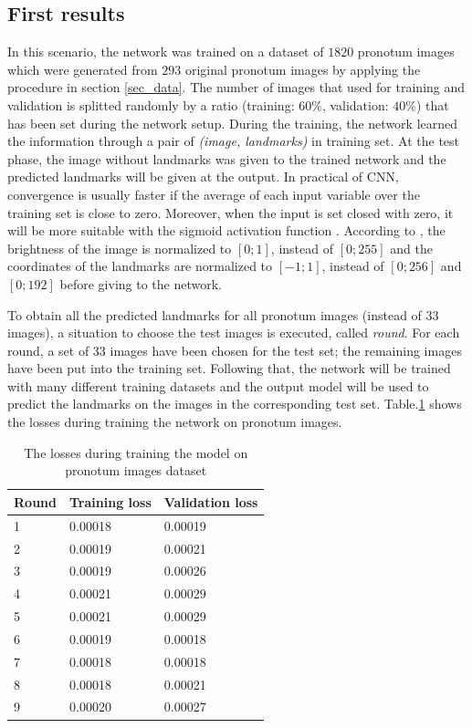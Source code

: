 \documentclass[10pt]{article}
\begin{document}
\subsection{First results}
\label{sectrain1}
In this scenario, the network was trained on a dataset of $1820$ pronotum images which were generated from $293$ original pronotum images by applying the procedure in section \ref{sec_data}. The number of images that
used for training and validation is splitted randomly by a ratio
(training: $60\%$, validation: $40\%$) that has been set during the
network setup. During the training, the network learned the information through a pair of \textit{(image, landmarks)} in training set. At the test phase, the image without landmarks was given to the trained network and the predicted landmarks will be given at the output. In practical of CNN, convergence is
usually faster if the average of each input variable over the
training set is close to zero. Moreover, when the input is set
closed with zero, it will be more suitable with the sigmoid
activation function \cite{lecun2012efficient}. According to \cite{lecun2012efficient}, the brightness of
the image is normalized to $[0; 1]$, instead of $[0; 255]$ and the
coordinates of the landmarks are normalized to $[-1; 1]$, instead
of $[0; 256]$ and $[0; 192]$ before giving to the network.



To obtain all the predicted landmarks for all pronotum images (instead of $33$ images), a situation to choose the test images is executed, called \textit{round}. For each round, a set of 33 images have been chosen for the test set; the remaining images have been put into the training set. Following that, the network will be trained with many different training datasets and the output model will be used to predict the landmarks on the images in the corresponding test set. Table.\ref{tbltrainingloss} shows the losses during training the network on pronotum images.

\begin{table}[h!]
	\centering
	\begin{tabular}{l l l}
	Round & Training loss & Validation loss \\ \hline
	1 & 0.00018 & 0.00019  \\ \hline
	2 & 0.00019 & 0.00021 \\ \hline
	3 & 0.00019 & 0.00026 \\ \hline
	4 & 0.00021 & 0.00029 \\ \hline
	5 & 0.00021 & 0.00029 \\ \hline
	6 & 0.00019 & 0.00018 \\ \hline
	7 & 0.00018 & 0.00018 \\ \hline
	8 & 0.00018 & 0.00021 \\ \hline
	9 & 0.00020 & 0.00027 \\ \hline
	\end{tabular}
	\caption{The losses during training the model on pronotum images dataset}
	\label{tbltrainingloss}
\end{table}
\end{document}
